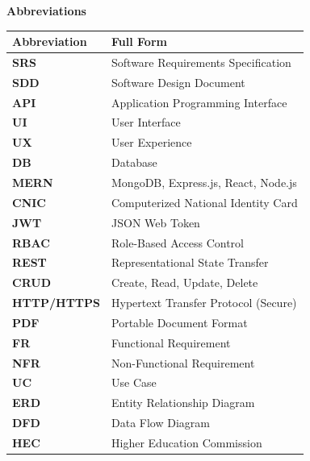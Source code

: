 
\newpage
\thispagestyle{plain}

\begin{center}
\textbf{\LARGE Abbreviations}
\end{center}

\vspace{1cm}

\begin{table}[h]
\centering
\renewcommand{\arraystretch}{1.4}
\begin{tabularx}{\textwidth}{|>{\raggedright\arraybackslash}p{3cm}|X|}
\hline
\textbf{Abbreviation} & \textbf{Full Form} \\
\hline
\textbf{SRS} & Software Requirements Specification \\ \hline
\textbf{SDD} & Software Design Document \\ \hline
\textbf{API} & Application Programming Interface \\ \hline
\textbf{UI} & User Interface \\ \hline
\textbf{UX} & User Experience \\ \hline
\textbf{DB} & Database \\ \hline
\textbf{MERN} & MongoDB, Express.js, React, Node.js \\ \hline
\textbf{CNIC} & Computerized National Identity Card \\ \hline
\textbf{JWT} & JSON Web Token \\ \hline
\textbf{RBAC} & Role-Based Access Control \\ \hline
\textbf{REST} & Representational State Transfer \\ \hline
\textbf{CRUD} & Create, Read, Update, Delete \\ \hline
\textbf{HTTP/HTTPS} & Hypertext Transfer Protocol (Secure) \\ \hline
\textbf{PDF} & Portable Document Format \\ \hline
\textbf{FR} & Functional Requirement \\ \hline
\textbf{NFR} & Non-Functional Requirement \\ \hline
\textbf{UC} & Use Case \\ \hline
\textbf{ERD} & Entity Relationship Diagram \\ \hline
\textbf{DFD} & Data Flow Diagram \\ \hline
\textbf{HEC} & Higher Education Commission \\ \hline
\end{tabularx}
\end{table}

\newpage
